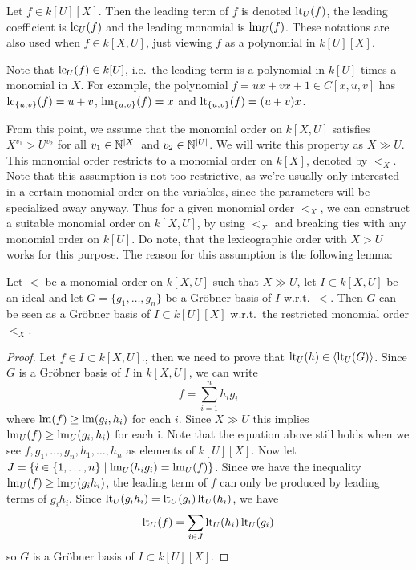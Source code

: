 \begin{definition}
  Let $f \in k[U][X]$. Then the leading term of $f$ is denoted $\operatorname{lt}_{U}(f)$, the leading coefficient is $\operatorname{lc}_{U}(f)$ and the leading monomial is $\operatorname{lm}_{U}(f)$. These notations are also used when $f \in k[X, U]$, just viewing $f$ as a polynomial in $k[U][X]$.
\end{definition}

Note that $\operatorname{lc}_{U}(f) \in k[U]$, i.e.\ the leading term is a polynomial in $k[U]$ times a monomial in $X$. For example, the polynomial $f = ux + vx + 1 \in C[x, u, v]$ has $\operatorname{lc}_{\{u, v\}}(f) = u + v$, $\operatorname{lm}_{\{u, v\}}(f) = x$ and $\operatorname{lt}_{\{u, v\}}(f) = (u+v)x$.

From this point, we assume that the monomial order on $k[X, U]$ satisfies $X^{v_{1}} > U^{v_{2}}$ for all $v_{1} \in \mathbb{N}^{|X|}$ and $v_{2} \in \mathbb{N}^{|U|}$. We will write this property as $X \gg U$. This monomial order restricts to a monomial order on $k[X]$, denoted by $<_{X}$. Note that this assumption is not too restrictive, as we're usually only interested in a certain monomial order on the variables, since the parameters will be specialized away anyway. Thus for a given monomial order $<_{X}$, we can construct a suitable monomial order on $k[X, U]$, by using $<_{X}$ and breaking ties with any monomial order on $k[U]$. Do note, that the lexicographic order with $X > U$ works for this purpose. The reason for this assumption is the following lemma:

\begin{lemma}\label{lem:block_order}
  Let $<$ be a monomial order on $k[X, U]$ such that $X \gg U$, let $I \subset k[X, U]$ be an ideal and let $G = \{g_{1}, \dots, g_{n}\}$ be a Gröbner basis of $I$ w.r.t.\ $<$. Then $G$ can be seen as a Gröbner basis of $I \subset k[U][X]$ w.r.t.\ the restricted monomial order $<_{X}$.
\end{lemma}
\begin{proof}
  Let $f \in I \subset k[X, U]$., then we need to prove that $\operatorname{lt}_{U}(h) \in \langle \operatorname{lt}_{U}(G) \rangle$. Since $G$ is a Gröbner basis of $I$ in $k[X, U]$, we can write
  \[ f = \sum_{i=1}^{n} h_{i} g_{i} \]
  where $\operatorname{lm}(f) \geq \operatorname{lm}(g_{i}, h_{i})$ for each $i$. Since $X \gg U$ this implies $\operatorname{lm}_{U}(f) \geq \operatorname{lm}_{U}(g_{i}, h_{i})$ for each i. Note that the equation above still holds when we see $f, g_{1}, \dots, g_{n}, h_{1}, \dots, h_{n}$ as elements of $k[U][X]$. Now let $J = \{i \in \{1, \dots, n\} \mid \operatorname{lm}_{U}(h_{i} g_{i}) = \operatorname{lm}_{U}(f)\}$. Since we have the inequality $\operatorname{lm}_{U}(f) \geq \operatorname{lm}_{U}(g_{i} h_{i})$, the leading term of $f$ can only be produced by leading terms of $g_{i}h_{i}$. Since $\operatorname{lt}_{U}(g_{i} h_{i}) = \operatorname{lt}_{U}(g_{i})\operatorname{lt}_{U}(h_{i})$, we have
  \[\operatorname{lt}_{U}(f) = \sum_{i \in J} \operatorname{lt}_{U}(h_{i}) \operatorname{lt}_{U}(g_{i})\]
  so $G$ is a Gröbner basis of $I \subset k[U][X]$.
\end{proof}










